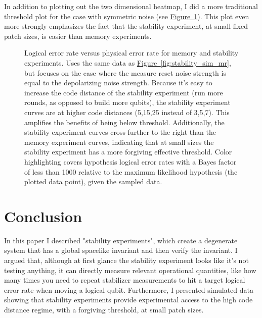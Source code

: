 \documentclass[onecolumn,unpublished,a4paper]{quantumarticle}
\theoremstyle{definition}
\theoremstyle{definition}
\theoremstyle{definition}
\newcommand{\fig}[1]{\hyperref[fig:#1]{Figure~\ref*{fig:#1}}}
\begin{document}
In addition to plotting out the two dimensional heatmap, I did a more traditional threshold plot for the case with symmetric noise (see \fig{stability_sim_threshold}).
This plot even more strongly emphasizes the fact that the stability experiment, at small fixed patch sizes, is easier than memory experiments.

\begin{figure}
    \centering
    \caption{
        Logical error rate versus physical error rate for memory and stability experiments.
        Uses the same data as \fig{stability_sim_mr}, but focuses on the case where the measure reset noise strength is equal to the depolarizing noise strength.
        Because it's easy to increase the code distance of the stability experiment (run more rounds, as opposed to build more qubits), the stability experiment curves are at higher code distances (5,15,25 instead of 3,5,7).
        This amplifies the benefits of being below threshold.
        Additionally, the stability experiment curves cross further to the right than the memory experiment curves, indicating that at small sizes the stability experiment has a more forgiving effective threshold.
        Color highlighting covers hypothesis logical error rates with a Bayes factor of less than 1000 relative to the maximum likelihood hypothesis (the plotted data point), given the sampled data.
    }
    \label{fig:stability_sim_threshold}
\end{figure}


\section{Conclusion}

In this paper I described "stability experiments", which create a degenerate system that has a global spacelike invariant and then verify the invariant.
I argued that, although at first glance the stability experiment looks like it's not testing anything, it can directly measure relevant operational quantities, like how many times you need to repeat stabilizer measurements to hit a target logical error rate when moving a logical qubit.
Furthermore, I presented simulated data showing that stability experiments provide experimental access to the high code distance regime, with a forgiving threshold, at small patch sizes.
\end{document}
